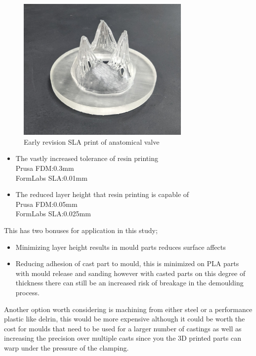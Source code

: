 \begin{figure}[H]
    \centering
    \includegraphics[width=0.75\textwidth]{figures/resinprintanat.jpg}
    \caption{Early revision \gls{SLA} print of anatomical valve}
    \label{fig:reso}
\end{figure}
\begin{itemize}
    \item The vastly increased tolerance of resin printing\\
          Prusa \gls{FDM}:0.3mm\\
          FormLabs \gls{SLA}:0.01mm
    \item The reduced layer height that resin printing is capable of\\
          Prusa \gls{FDM}:0.05mm\\
          FormLabs \gls{SLA}:0.025mm
\end{itemize}
This has two bonuses for application in this study;
\begin{itemize}
    \item Minimizing layer height results in mould parts reduces surface affects
    \item Reducing adhesion of cast part to mould, this is minimized on \gls{PLA} parts with mould release and sanding however with casted parts on this degree of thickness there can still be an increased risk of breakage in the demoulding process.
\end{itemize}
Another option worth considering is machining from either steel or a performance plastic like delrin, this would be more expensive although it could be worth the cost for moulds that need to be used for a larger number of castings as well as increasing the precision over multiple casts since you the 3D printed parts can warp under the pressure of the clamping.

